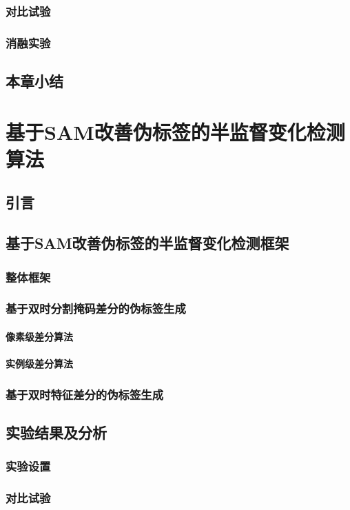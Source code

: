 \documentclass[lang=chs, degree=master, blindreview=false, adobe=false]{yanputhesis}
\begin{document}
\subsection{对比试验}
\subsection{消融实验}
\section{本章小结}


\chapter{基于SAM改善伪标签的半监督变化检测算法}
\section{引言}
\section{基于SAM改善伪标签的半监督变化检测框架}
\subsection{整体框架}
\subsection{基于双时分割掩码差分的伪标签生成}
\subsubsection{像素级差分算法}
\subsubsection{实例级差分算法}
\subsection{基于双时特征差分的伪标签生成}
\section{实验结果及分析}
\subsection{实验设置}
\subsection{对比试验}
\end{document}
